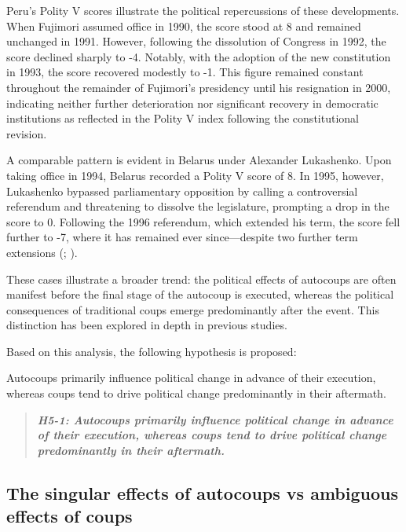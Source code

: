 \documentclass[
  12pt,
]{report}
\begin{document}
Peru's Polity V scores illustrate the political repercussions of these
developments. When Fujimori assumed office in 1990, the score stood at 8
and remained unchanged in 1991. However, following the dissolution of
Congress in 1992, the score declined sharply to -4. Notably, with the
adoption of the new constitution in 1993, the score recovered modestly
to -1. This figure remained constant throughout the remainder of
Fujimori's presidency until his resignation in 2000, indicating neither
further deterioration nor significant recovery in democratic
institutions as reflected in the Polity V index following the
constitutional revision.

A comparable pattern is evident in Belarus under Alexander Lukashenko.
Upon taking office in 1994, Belarus recorded a Polity V score of 8. In
1995, however, Lukashenko bypassed parliamentary opposition by calling a
controversial referendum and threatening to dissolve the legislature,
prompting a drop in the score to 0. Following the 1996 referendum, which
extended his term, the score fell further to -7, where it has remained
ever since---despite two further term extensions
(; ).

These cases illustrate a broader trend: the political effects of
autocoups are often manifest before the final stage of the autocoup is
executed, whereas the political consequences of traditional coups emerge
predominantly after the event. This distinction has been explored in
depth in previous studies.

Based on this analysis, the following hypothesis is proposed:

Autocoups primarily influence political change in advance of their
execution, whereas coups tend to drive political change predominantly in
their aftermath.

\begin{quote}
\textbf{\emph{H5-1: Autocoups primarily influence political change in
advance of their execution, whereas coups tend to drive political change
predominantly in their aftermath.}}
\end{quote}

\subsection{\texorpdfstring{\textbf{The singular effects of autocoups vs
ambiguous effects of
coups}}{The singular effects of autocoups vs ambiguous effects of coups}}\label{the-singular-effects-of-autocoups-vs-ambiguous-effects-of-coups}
\end{document}
